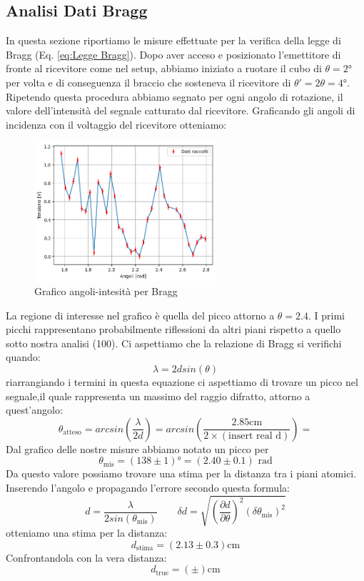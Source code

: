 \documentclass[letterpaper,12pt]{article}
\begin{document}
\subsection{Analisi Dati Bragg}
In questa sezione riportiamo le misure effettuate per la verifica della legge di Bragg (Eq. \ref{eq:Legge Bragg}). Dopo aver acceso e posizionato l'emettitore di fronte al ricevitore come nel setup, abbiamo iniziato a ruotare il cubo di $\theta = 2\text{°}$ per volta e di conseguenza il braccio che sosteneva il ricevitore di $\theta' = 2\theta = 4\text{°}$.
Ripetendo questa procedura abbiamo segnato per ogni angolo di rotazione, il valore dell'intensità del segnale catturato dal ricevitore.
Graficando gli angoli di incidenza con il voltaggio del ricevitore otteniamo: 
\begin{figure}[h!]
	\centering
	\includegraphics[width = 0.6\textwidth]{Grafico1_bragg.png}
	\caption{Grafico angoli-intesità per Bragg}
	\label{fig:GraficoBragg3}
\end{figure}

La regione di interesse nel grafico è quella del picco attorno a $\theta=2.4$. I primi picchi rappresentano probabilmente riflessioni da altri piani rispetto a quello sotto nostra analisi (100).
Ci aspettiamo che la relazione di Bragg si verifichi quando:
$$ \lambda = 2dsin(\theta) $$
riarrangiando i termini in questa equazione ci aspettiamo di trovare un picco nel segnale,il quale rappresenta un massimo del raggio difratto, attorno a quest'angolo:
$$ \theta_\text{atteso} = arcsin\left(\frac{\lambda}{2d}\right) = arcsin\left(\frac{2.85\text{cm}}{2\times(\text{insert real d})}\right) =  $$ 
Dal grafico delle nostre misure abbiamo notato un picco per $$\theta_\text{mis} = (138 \pm1)\text{°} = (2.40 \pm0.1)\text{ rad}$$
Da questo valore possiamo trovare una stima per la distanza tra i piani atomici.
Inserendo l'angolo e propagando l'errore secondo questa formula: 
$$ d = \frac{\lambda}{2sin(\theta_\text{mis})} \qquad \delta d = \sqrt{\left( \frac{\partial d}{\partial \theta} \right)^2 (\delta \theta_\text{mis})^2} $$ 
otteniamo una stima per la distanza: $$ d_\text{stima} = (2.13 \pm0.3) \text{cm} $$ 	
Confrontandola con la vera distanza: $$ d_\text{true} = ( \pm) \text{cm} $$ 
\end{document}
